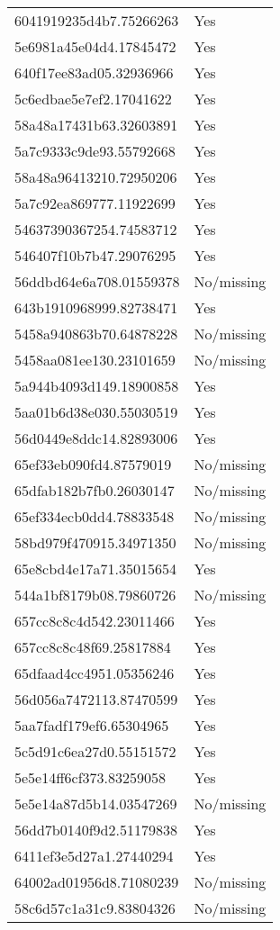 \begin{tabular}{ll}
6041919235d4b7.75266263 & Yes \\
5e6981a45e04d4.17845472 & Yes \\
640f17ee83ad05.32936966 & Yes \\
5c6edbae5e7ef2.17041622 & Yes \\
58a48a17431b63.32603891 & Yes \\
5a7c9333c9de93.55792668 & Yes \\
58a48a96413210.72950206 & Yes \\
5a7c92ea869777.11922699 & Yes \\
54637390367254.74583712 & Yes \\
546407f10b7b47.29076295 & Yes \\
56ddbd64e6a708.01559378 & No/missing \\
643b1910968999.82738471 & Yes \\
5458a940863b70.64878228 & No/missing \\
5458aa081ee130.23101659 & No/missing \\
5a944b4093d149.18900858 & Yes \\
5aa01b6d38e030.55030519 & Yes \\
56d0449e8ddc14.82893006 & Yes \\
65ef33eb090fd4.87579019 & No/missing \\
65dfab182b7fb0.26030147 & No/missing \\
65ef334ecb0dd4.78833548 & No/missing \\
58bd979f470915.34971350 & No/missing \\
65e8cbd4e17a71.35015654 & Yes \\
544a1bf8179b08.79860726 & No/missing \\
657cc8c8c4d542.23011466 & Yes \\
657cc8c8c48f69.25817884 & Yes \\
65dfaad4cc4951.05356246 & Yes \\
56d056a7472113.87470599 & Yes \\
5aa7fadf179ef6.65304965 & Yes \\
5c5d91c6ea27d0.55151572 & Yes \\
5e5e14ff6cf373.83259058 & Yes \\
5e5e14a87d5b14.03547269 & No/missing \\
56dd7b0140f9d2.51179838 & Yes \\
6411ef3e5d27a1.27440294 & Yes \\
64002ad01956d8.71080239 & No/missing \\
58c6d57c1a31c9.83804326 & No/missing \\

\end{tabular}

